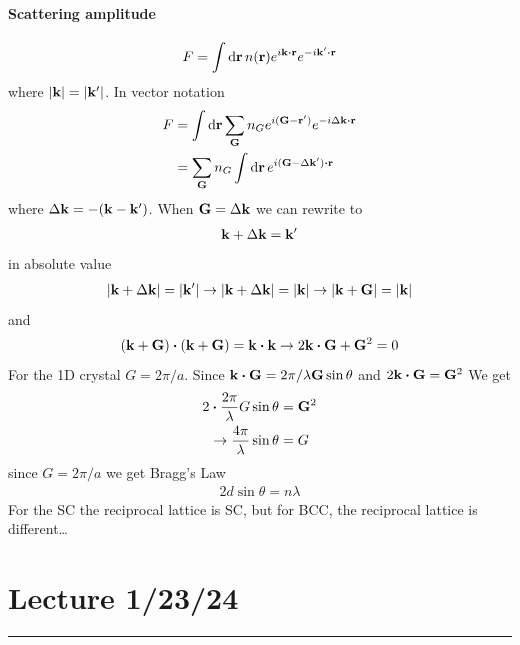 \documentclass[../main.tex]{subfiles}
\begin{document}
\paragraph{Scattering amplitude}
\begin{align*}
    F = \int \dd{\vb{r}} n(\vb{r}) e^{i\vb{k} \vdot \vb{r}} e^{-i\vb{k}' \vdot \vb{r}}
\end{align*}
where $\abs{\vb{k}} = \abs{\vb{k}'}$. In vector notation
\begin{align*}
    F &= \int \dd{\vb{r}} \sum_{\vb{G}} n_G e^{i(\vb{G} - \vb{r}')} e^{-i\Delta\vb{k} \vdot \vb{r}} \\
    &= \sum_{\vb{G}} n_G \int \dd{\vb{r}} e^{i(\vb{G} - \Delta\vb{k}') \vdot \vb{r}} \\
\end{align*}
where $\Delta\vb{k} = -(\vb{k} - \vb{k}')$. When $\vb{G} = \Delta\vb{k}$ we can rewrite to
\begin{align*}
    \vb{k} + \Delta\vb{k} = \vb{k}'
\end{align*}
in absolute value
\begin{align*}
    \abs{\vb{k} + \Delta\vb{k}} = \abs{\vb{k}'} \rightarrow
    \abs{\vb{k} + \Delta\vb{k}} = \abs{\vb{k}} \rightarrow
    \abs{\vb{k} + \vb{G}} = \abs{\vb{k}}
\end{align*}
and
\begin{align*}
    (\vb{k} + \vb{G}) \vdot (\vb{k} + \vb{G}) = \vb{k} \vdot \vb{k} \rightarrow
    2\vb{k} \vdot \vb{G} + \vb{G}^2 = 0
\end{align*}
For the 1D crystal $G = 2\pi / a$. Since $\vb{k} \vdot \vb{G} = 2\pi/\lambda \vb{G} \sin\theta$
and $2\vb{k} \vdot \vb{G} = \vb{G}^2$
We get
\begin{align*}
    2 \vdot \frac{2\pi}{\lambda} G \sin\theta &= \vb{G}^2 \\
    \rightarrow \frac{4\pi}{\lambda} \sin\theta &= G 
\end{align*}
since $G = 2\pi / a$ we get Bragg's Law
\begin{align*}
    2d \sin\theta = n\lambda
\end{align*}
For the SC the reciprocal lattice is SC, but for BCC, the reciprocal lattice is different\dots

\newpage
\section{Lecture 1/23/24}
\hrule \vspace{10px}
\end{document}
